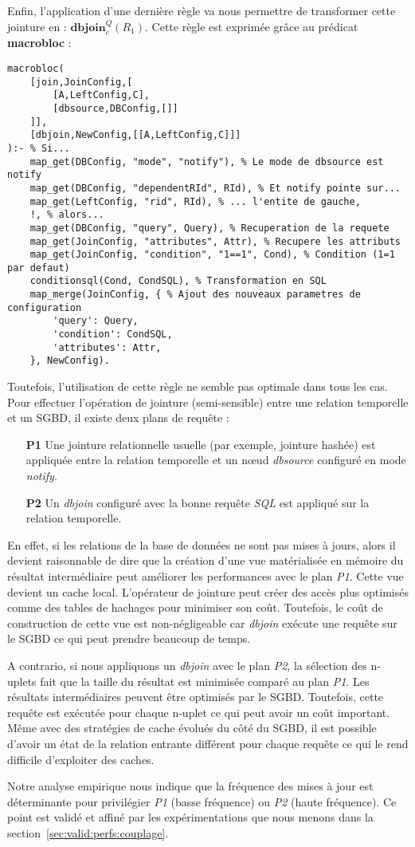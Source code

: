 Enfin, l'application d'une dernière règle va nous permettre de transformer cette jointure en : $\textbf{dbjoin}^Q_c (R_1)$. Cette règle est exprimée grâce au prédicat \textbf{macrobloc} :

\begin{lstlisting}
macrobloc(
    [join,JoinConfig,[
        [A,LeftConfig,C],
        [dbsource,DBConfig,[]]
    ]],
    [dbjoin,NewConfig,[[A,LeftConfig,C]]]
):- % Si...
    map_get(DBConfig, "mode", "notify"), % Le mode de dbsource est notify
    map_get(DBConfig, "dependentRId", RId), % Et notify pointe sur...
    map_get(LeftConfig, "rid", RId), % ... l'entite de gauche,
    !, % alors...
    map_get(DBConfig, "query", Query), % Recuperation de la requete
    map_get(JoinConfig, "attributes", Attr), % Recupere les attributs
    map_get(JoinConfig, "condition", "1==1", Cond), % Condition (1=1 par defaut)
    conditionsql(Cond, CondSQL), % Transformation en SQL
    map_merge(JoinConfig, { % Ajout des nouveaux parametres de configuration
        'query': Query,
        'condition': CondSQL, 
        'attributes': Attr,
    }, NewConfig).
\end{lstlisting}

Toutefois, l'utilisation de cette règle ne semble pas optimale dans tous les cas. Pour effectuer l'opération de jointure (semi-sensible) entre une relation temporelle et un SGBD, il existe deux plans de requête :
\begin{itemize}
    \item[\textbf{P1}] Une jointure relationnelle usuelle (par exemple, jointure hashée) est appliquée entre la relation temporelle et un nœud \textit{dbsource} configuré en mode \textit{notify}.
    \item[\textbf{P2}] Un \textit{dbjoin} configuré avec la bonne requête \textit{SQL} est appliqué sur la relation temporelle.
\end{itemize}

En effet, si les relations de la base de données ne sont pas mises à jours, alors il devient raisonnable de dire que la création d'une vue matérialisée en mémoire du résultat intermédiaire peut améliorer les performances avec le plan \textit{P1}. Cette vue devient un cache local. L'opérateur de jointure peut créer des accès plus optimisés comme des tables de hachages pour minimiser son coût. Toutefois, le coût de construction de cette vue est non-négligeable car \textit{dbjoin} exécute une requête sur le SGBD ce qui peut prendre beaucoup de temps.

A contrario, si nous appliquons un \textit{dbjoin} avec le plan \textit{P2}, la sélection des n-uplets fait que la taille du résultat est minimisée comparé au plan \textit{P1}. Les résultats intermédiaires peuvent être optimisés par le SGBD. Toutefois, cette requête est exécutée pour chaque n-uplet ce qui peut avoir un coût important. Même avec des stratégies de cache évolués du côté du SGBD, il est possible d'avoir un état de la relation entrante différent pour chaque requête ce qui le rend difficile d'exploiter des caches.

Notre analyse empirique nous indique que la fréquence des mises à jour est déterminante pour privilégier \textit{P1} (basse fréquence) ou \textit{P2} (haute fréquence). Ce point est validé et affiné par les expérimentations que nous menons dans la section~\ref{sec:valid:perfs:couplage}.

